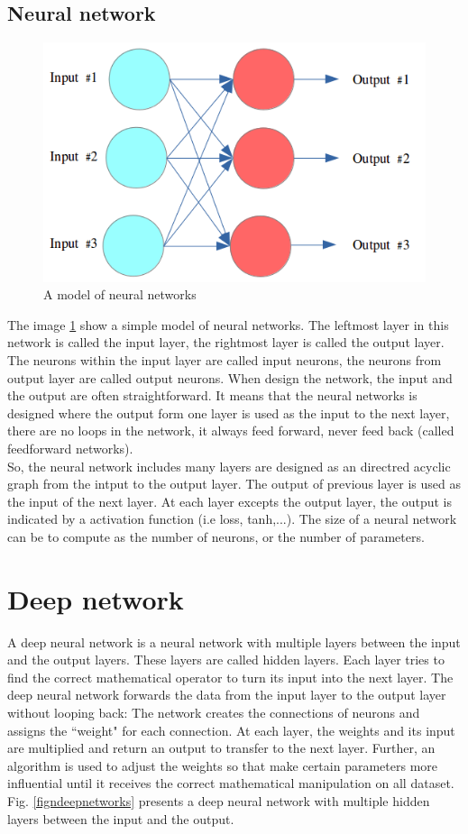 \subsection{Neural network}
\begin{figure}[h]
	\centering
	\includegraphics[scale=0.5]{images/neural_net}
	\caption{A model of neural networks}
	\label{fignnnetworks}
\end{figure}
The image \ref{fignnnetworks} show a simple model of neural networks. The leftmost layer in this network is called the input layer, the rightmost layer is called the output layer. The neurons within the input layer are called input neurons, the neurons from output layer are called output neurons. When design the network, the input and the output are often straightforward. It means that the neural networks is designed where the output form one layer is used as the input to the next layer, there are no loops in the network, it always feed forward, never feed back (called feedforward networks).\\[0.2cm]
So, the neural network includes many layers are designed as an directred acyclic graph from the intput to the output layer. The output of previous layer is used as the input of the next layer. At each layer excepts the output layer, the output is indicated by a activation function (i.e loss, tanh,...). The size of a neural network can be to compute as the number of neurons, or the number of parameters.
\section{Deep network}
A deep neural network is a neural network with multiple layers between the input and the output layers. These layers are called hidden layers. Each layer tries to find the correct mathematical operator to turn its input into the next layer. The deep neural network forwards the data from the input layer to the output layer without looping back: The network creates the connections of neurons and assigns the ``weight" for each connection. At each layer, the weights and its input are multiplied and return an output to transfer to the next layer. Further, an algorithm is used to adjust the weights so that make certain parameters more influential until it receives the correct mathematical manipulation on all dataset. Fig. \ref{figndeepnetworks} presents a deep neural network with multiple hidden layers between the input and the output.


